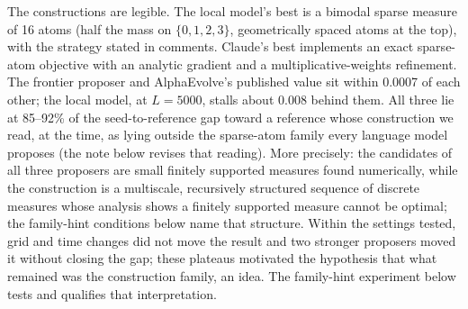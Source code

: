 \documentclass[11pt]{article}
\begin{document}
The constructions are legible. The local model's best is a bimodal sparse
measure of 16 atoms (half the mass on $\{0,1,2,3\}$, geometrically
spaced atoms at the top), with the strategy stated in comments. Claude's
best implements an exact sparse-atom objective with an analytic gradient
and a multiplicative-weights refinement. The frontier proposer and AlphaEvolve's published value sit within
0.0007 of each other; the local model, at $L{=}5000$, stalls about 0.008 behind them.
All three lie at 85--92\% of the seed-to-reference gap toward a
reference whose construction we read, at the time, as lying outside the
sparse-atom family every language model proposes (the note below
revises that reading). More precisely: the
candidates of all three proposers are small finitely supported measures found
numerically, while the \citet{bellec2024beat} construction is a
multiscale, recursively structured sequence of discrete measures whose
analysis shows a finitely supported measure cannot be optimal; the
family-hint conditions below name that structure. Within the settings
tested, grid and time changes did not move the result and two stronger
proposers moved it without closing the gap; these plateaus motivated the
hypothesis that what remained was the construction family, an idea. The
family-hint experiment below tests and qualifies that interpretation.
\end{document}
